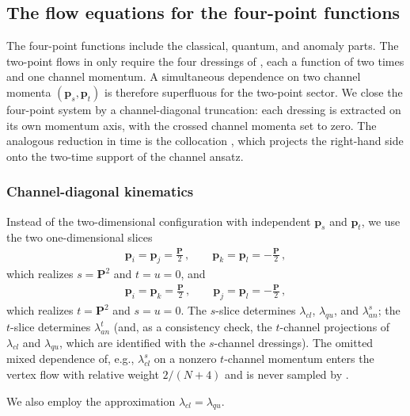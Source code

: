 \documentclass[reprint,english,superscriptaddress,preprintnumbers,amsmath,amssymb,aps,prd]{revtex4-1}
\makeatletter
\newcommand*{\eg}{e.g.\@\xspace}
\makeatother
\begin{document}
\subsection{The flow equations for the four-point functions}
\label{sec:4pointflow}

The four-point functions include the classical, quantum, and anomaly parts. The two-point flows in  only require the four dressings of , each a function of two times and one channel momentum. A simultaneous dependence on two channel momenta $(\boldsymbol{p}_{s},\boldsymbol{p}_{t})$ is therefore superfluous for the two-point sector. We close the four-point system by a channel-diagonal truncation: each dressing is extracted on its own momentum axis, with the crossed channel momenta set to zero. The analogous reduction in time is the collocation , which projects the right-hand side onto the two-time support of the channel ansatz.

\subsubsection{Channel-diagonal kinematics}

Instead of the two-dimensional configuration with independent $\boldsymbol{p}_{s}$ and $\boldsymbol{p}_{t}$, we use the two one-dimensional slices
\begin{align}
    \boldsymbol{p}_{i}=\boldsymbol{p}_{j}=\frac{\boldsymbol{P}}{2}\,,\qquad
    \boldsymbol{p}_{k}=\boldsymbol{p}_{l}=-\frac{\boldsymbol{P}}{2}\,,
    \label{eq:s-slice}
\end{align}
which realizes $s=\boldsymbol{P}^{2}$ and $t=u=0$, and
\begin{align}
    \boldsymbol{p}_{i}=\boldsymbol{p}_{k}=\frac{\boldsymbol{P}}{2}\,,\qquad
    \boldsymbol{p}_{j}=\boldsymbol{p}_{l}=-\frac{\boldsymbol{P}}{2}\,,
    \label{eq:t-slice}
\end{align}
which realizes $t=\boldsymbol{P}^{2}$ and $s=u=0$. The $s$-slice determines $\lambda_{cl}$, $\lambda_{qu}$, and $\lambda_{an}^{s}$; the $t$-slice determines $\lambda_{an}^{t}$ (and, as a consistency check, the $t$-channel projections of $\lambda_{cl}$ and $\lambda_{qu}$, which are identified with the $s$-channel dressings). The omitted mixed dependence of, \eg, $\lambda_{cl}^{s}$ on a nonzero $t$-channel momentum enters the vertex flow with relative weight $2/(N+4)$ and is never sampled by . 

We also employ the approximation $\lambda_{cl}=\lambda_{qu}$.
\end{document}
